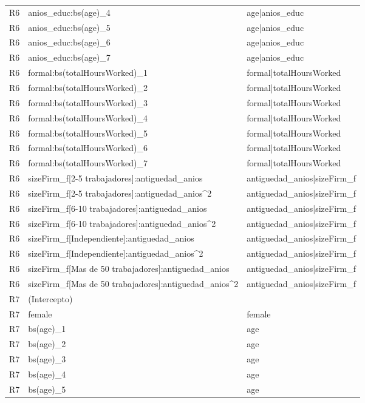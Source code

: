 \begin{longtable}{lll}
R6 & anios\_educ:bs(age)\_4 & age|anios\_educ \\
R6 & anios\_educ:bs(age)\_5 & age|anios\_educ \\
R6 & anios\_educ:bs(age)\_6 & age|anios\_educ \\
R6 & anios\_educ:bs(age)\_7 & age|anios\_educ \\
R6 & formal:bs(totalHoursWorked)\_1 & formal|totalHoursWorked \\
R6 & formal:bs(totalHoursWorked)\_2 & formal|totalHoursWorked \\
R6 & formal:bs(totalHoursWorked)\_3 & formal|totalHoursWorked \\
R6 & formal:bs(totalHoursWorked)\_4 & formal|totalHoursWorked \\
R6 & formal:bs(totalHoursWorked)\_5 & formal|totalHoursWorked \\
R6 & formal:bs(totalHoursWorked)\_6 & formal|totalHoursWorked \\
R6 & formal:bs(totalHoursWorked)\_7 & formal|totalHoursWorked \\
R6 & sizeFirm\_f[2-5 trabajadores]:antiguedad\_anios & antiguedad\_anios|sizeFirm\_f \\
R6 & sizeFirm\_f[2-5 trabajadores]:antiguedad\_anios\textasciicircum 2 & antiguedad\_anios|sizeFirm\_f \\
R6 & sizeFirm\_f[6-10 trabajadores]:antiguedad\_anios & antiguedad\_anios|sizeFirm\_f \\
R6 & sizeFirm\_f[6-10 trabajadores]:antiguedad\_anios\textasciicircum 2 & antiguedad\_anios|sizeFirm\_f \\
R6 & sizeFirm\_f[Independiente]:antiguedad\_anios & antiguedad\_anios|sizeFirm\_f \\
R6 & sizeFirm\_f[Independiente]:antiguedad\_anios\textasciicircum 2 & antiguedad\_anios|sizeFirm\_f \\
R6 & sizeFirm\_f[Mas de 50 trabajadores]:antiguedad\_anios & antiguedad\_anios|sizeFirm\_f \\
R6 & sizeFirm\_f[Mas de 50 trabajadores]:antiguedad\_anios\textasciicircum 2 & antiguedad\_anios|sizeFirm\_f \\
R7 & (Intercepto) &  \\
R7 & female & female \\
R7 & bs(age)\_1 & age \\
R7 & bs(age)\_2 & age \\
R7 & bs(age)\_3 & age \\
R7 & bs(age)\_4 & age \\
R7 & bs(age)\_5 & age \\

\end{longtable}
